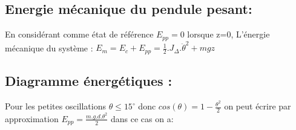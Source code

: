 \documentclass[12pt]{article}
\begin{document}
\subsection{Energie mécanique du pendule pesant: }
En considérant comme état de référence $E_{pp}=0$ lorsque z=0,  L'énergie mécanique du système : $E_m = E_c + E_{pp} = \frac{1}{2}.J_\Delta.\ddot{\theta}^2 + mgz$

\subsection{Diagramme énergétiques :}






Pour les petites oscillations $\theta \leq 15^{\circ}$ donc $cos(\theta) = 1- \frac{\theta^2}{2}$
on peut écrire par approximation $E_{pp} = \frac{m.g.d.\theta^2}{2}$ dans ce cas on a: 






\end{document}
